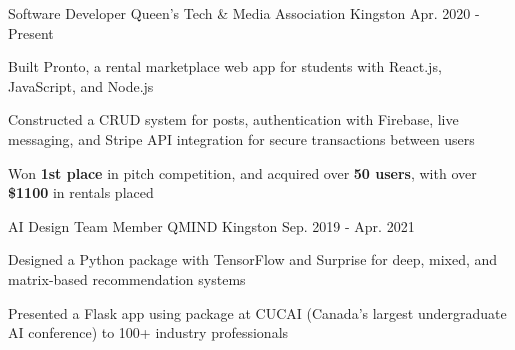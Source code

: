 

\begin{cventries}

  \cventry
    {Software Developer} %
    {Queen’s Tech \& Media Association} %
    {Kingston} %
    {Apr. 2020 - Present} %
    {
      \begin{cvitems} %
        \item {Built Pronto, a rental marketplace web app for students with React.js, JavaScript, and Node.js}
        \item {Constructed a CRUD system for posts, authentication with Firebase, live messaging, and Stripe API integration for secure transactions between users}
        \item {Won \textbf{1st place} in pitch competition, and acquired over \textbf{50 users}, with over \textbf{\$1100} in rentals placed}
      \end{cvitems}
    }

  \cventry
    {AI Design Team Member} %
    {QMIND} %
    {Kingston} %
    {Sep. 2019 - Apr. 2021} %
    {
      \begin{cvitems} %
        \item {Designed a Python package with TensorFlow and Surprise for deep, mixed, and matrix-based recommendation systems}
        \item {Presented a Flask app using package at CUCAI (Canada’s largest undergraduate AI conference) to 100+ industry professionals}
      \end{cvitems}
    }


\end{cventries}
